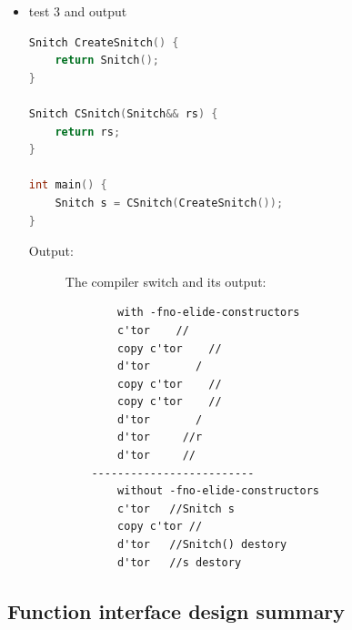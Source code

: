 \documentclass[a4paper,11pt,twoside]{book}
\begin{document}
\begin{itemize}
	\item test 3 and output
\begin{lstlisting}[frame=single, language=c++]
Snitch CreateSnitch() {
	return Snitch();
}
	
Snitch CSnitch(Snitch&& rs) {
	return rs;
}
	
int main() {
	Snitch s = CSnitch(CreateSnitch());
}
\end{lstlisting}
\begin{description}
	\item[Output:] The compiler switch and its output:
	\begin{verbatim}
		with -fno-elide-constructors
		c'tor    //
		copy c'tor    //
		d'tor       /
		copy c'tor    //
		copy c'tor    //
		d'tor       /
		d'tor     //r
		d'tor     //
	-------------------------
		without -fno-elide-constructors
		c'tor   //Snitch s
		copy c'tor //
		d'tor   //Snitch() destory
		d'tor   //s destory
	\end{verbatim}
\end{description}
\end{itemize}



\subsection{Function interface design summary}
\end{document}
